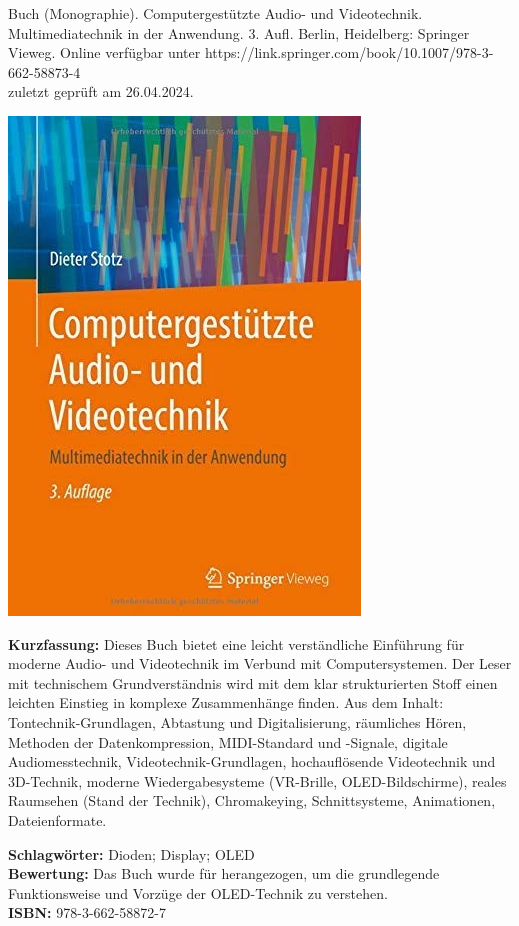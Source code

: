 {
Buch (Monographie). Computergestützte Audio- und Videotechnik. Multimediatechnik in der Anwendung. 3. Aufl. Berlin, Heidelberg: Springer Vieweg. Online verfügbar unter https://link.springer.com/book/10.1007/978-3-662-58873-4 \\zuletzt geprüft am 26.04.2024. \\
\begin{minipage}{0.38\textwidth}
	\includegraphics[width=\linewidth]{images/Stotz.jpg}
\end{minipage}
\hfill
\begin{minipage}{0.6\textwidth}
\textbf{Kurzfassung:}
Dieses Buch bietet eine leicht verständliche Einführung für moderne Audio- und Videotechnik im Verbund mit Computersystemen. Der Leser mit technischem Grundverständnis wird mit dem klar strukturierten Stoff einen leichten Einstieg in komplexe Zusammenhänge finden. Aus dem Inhalt: Tontechnik-Grundlagen, Abtastung und Digitalisierung, räumliches Hören, Methoden der Datenkompression, MIDI-Standard und -Signale, digitale Audiomesstechnik, Videotechnik-Grundlagen, hochauflösende Videotechnik und 3D-Technik, moderne Wiedergabesysteme (VR-Brille, OLED-Bildschirme), reales Raumsehen (Stand der Technik), Chromakeying, Schnittsysteme, Animationen, Dateienformate.	
\end{minipage}
\textbf{Schlagwörter:}
Dioden; Display; OLED
\\ \textbf{Bewertung:}
Das Buch wurde für herangezogen, um die grundlegende Funktionsweise und Vorzüge der OLED-Technik zu verstehen.
\\ \textbf{ISBN:}
978-3-662-58872-7
}

